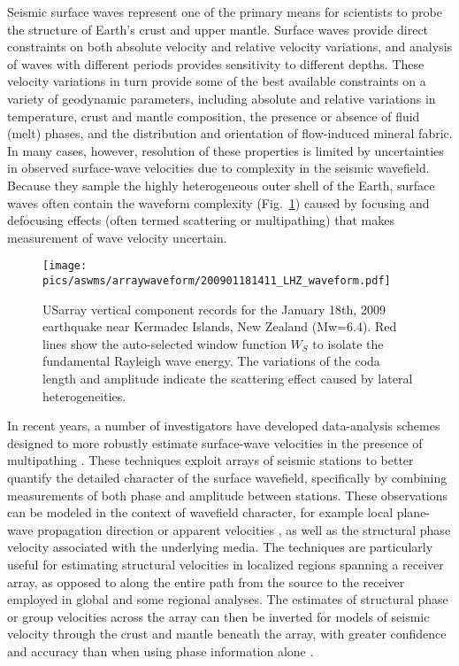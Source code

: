 Seismic surface waves represent one of the primary means for scientists to probe the structure of Earth's crust and upper mantle.  Surface waves provide direct constraints on both absolute velocity and relative velocity variations, and analysis of waves with different periods provides sensitivity to different depths.  These velocity variations in turn provide some of the best available constraints on a variety of geodynamic parameters, including absolute and relative variations in temperature, crust and mantle composition, the presence or absence of fluid (melt) phases, and the distribution and orientation of flow-induced mineral fabric.  In many cases, however, resolution of these properties is limited by uncertainties in observed surface-wave velocities due to complexity in the seismic wavefield.  Because they sample the highly heterogeneous outer shell of the Earth, surface waves often contain the waveform complexity (Fig.~\ref{fig:arraywaveform}) caused by focusing and defocusing effects (often termed scattering or multipathing) that makes measurement of wave velocity uncertain. 

\begin{figure}
	\texttt{[image: pics/aswms/arraywaveform/200901181411\_LHZ\_waveform.pdf]}	
	\caption[USarray vertical component records for the January 18th, 2009 earthquake near Kermadec Islands, New Zealand (Mw=6.4).]{USarray vertical component records for the January 18th, 2009 earthquake near Kermadec Islands, New Zealand (Mw=6.4). Red lines show the auto-selected window function $W_S$ to isolate the fundamental Rayleigh wave energy. The variations of the coda length and amplitude indicate the scattering effect caused by lateral heterogeneities.}
	\label{fig:arraywaveform}
\end{figure}

In recent years, a number of investigators have developed data-analysis schemes designed to more robustly estimate surface-wave velocities in the presence of multipathing \citep[e.g.][]{Friederich:1995cea,Forsyth:2005id,Yang:2006fc,Lin:2009fx,Pollitz:2010gk,Lin:2011fw,Yang:2011kt}.  These techniques exploit arrays of seismic stations to better quantify the detailed character of the surface wavefield, specifically by combining measurements of both phase and amplitude between stations.  These observations can be modeled in the context of wavefield character, for example local plane-wave propagation direction \citep[e.g.,][]{Forsyth:2005id} or apparent velocities \citep{Lin:2009fx}, as well as the structural phase velocity associated with the underlying media. The techniques are particularly useful for estimating structural velocities in localized regions spanning a receiver array, as opposed to along the entire path from the source to the receiver employed in global \citep[e.g.,][]{Levshin:1992ve,Li:1996br,Ekstrom:1997ff} and some regional \citep[e.g.,][]{Chen:2007it,Tape:2010bm,Zhu:2012gm} analyses.  The estimates of structural phase or group velocities across the array can then be inverted for models of seismic velocity through the crust and mantle beneath the array, with greater confidence and accuracy than when using phase information alone \citep[e.g.,][]{Yang:2011kt,Rau:2011hc,Lin:2011fw,Pollitz:2010gk}.

